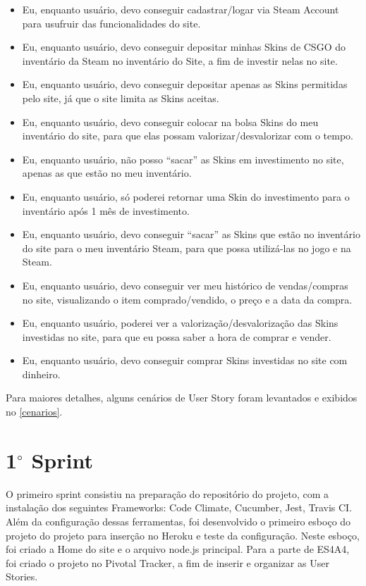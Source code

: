 \begin{itemize}
\item Eu, enquanto usuário, devo conseguir cadastrar/logar via Steam Account para usufruir das 
funcionalidades do site.

\item Eu, enquanto usuário, devo conseguir depositar minhas Skins de CSGO do inventário da Steam no 
inventário do Site, a fim de investir nelas no site.

\item Eu, enquanto usuário, devo conseguir depositar apenas as Skins permitidas pelo site, já que o 
site limita as Skins aceitas.

\item Eu, enquanto usuário, devo conseguir colocar na bolsa Skins do meu inventário do site, para 
que elas possam valorizar/desvalorizar com o tempo.

\item Eu, enquanto usuário, não posso ``sacar'' as Skins em investimento no site, apenas as que estão no 
meu inventário.

\item Eu, enquanto usuário, só poderei retornar uma Skin do investimento para o inventário após 1 mês 
de investimento.

\item Eu, enquanto usuário, devo conseguir ``sacar'' as Skins que estão no inventário do site para o meu 
inventário Steam, para que possa utilizá-las no jogo e na Steam.

\item Eu, enquanto usuário, devo conseguir ver meu histórico de vendas/compras no site, visualizando o 
item comprado/vendido, o preço e a data da compra.

\item Eu, enquanto usuário, poderei ver a valorização/desvalorização das Skins investidas no site, para 
que eu possa saber a hora de comprar e vender.

\item Eu, enquanto usuário, devo conseguir comprar Skins investidas no site com dinheiro.
\end{itemize}

Para maiores detalhes, alguns cenários de User Story foram levantados e exibidos no \autoref{cenarios}.

\section{1$^{\circ}$ Sprint}
O primeiro sprint consistiu na preparação do repositório do projeto, com a instalação dos seguintes
Frameworks: Code Climate, Cucumber, Jest, Travis CI. Além da configuração dessas ferramentas,
foi desenvolvido o primeiro esboço do projeto do projeto para inserção no Heroku e teste da configuração.
Neste esboço, foi criado a Home do site e o arquivo node.js principal. Para a parte de ES4A4,
foi criado o projeto no Pivotal Tracker, a fim de inserir e organizar as User Stories.

